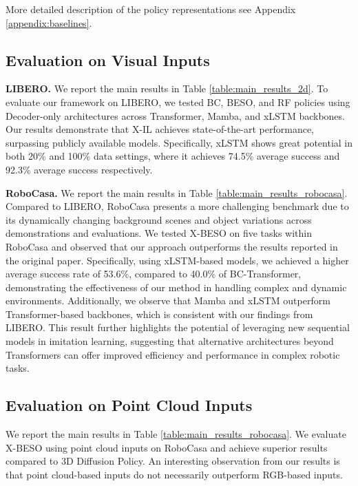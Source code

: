 
More detailed description of the policy representations see Appendix \ref{appendix:baselines}.



\subsection{Evaluation on Visual Inputs}
\textbf{LIBERO.} We report the main results in Table \ref{table:main_results_2d}. To evaluate our framework on LIBERO, we tested BC, BESO, and RF policies using Decoder-only architectures across Transformer, Mamba, and xLSTM backbones. Our results demonstrate that X-IL achieves state-of-the-art performance, surpassing publicly available models. Specifically, xLSTM shows great potential in both 20\% and 100\% data settings, where it achieves 74.5\% average success and 92.3\% average success respectively. 

\textbf{RoboCasa.} We report the main results in Table \ref{table:main_results_robocasa}. Compared to LIBERO, RoboCasa presents a more challenging benchmark due to its dynamically changing background scenes and object variations across demonstrations and evaluations. We tested X-BESO on five tasks within RoboCasa and observed that our approach outperforms the results reported in the original paper. Specifically, using xLSTM-based models, we achieved a higher average success rate of 53.6\%, compared to 40.0\% of BC-Transformer, demonstrating the effectiveness of our method in handling complex and dynamic environments. Additionally, we observe that Mamba and xLSTM outperform Transformer-based backbones, which is consistent with our findings from LIBERO. This result further highlights the potential of leveraging new sequential models in imitation learning, suggesting that alternative architectures beyond Transformers can offer improved efficiency and performance in complex robotic tasks.



\subsection{Evaluation on Point Cloud Inputs}
We report the main results in Table \ref{table:main_results_robocasa}.
We evaluate X-BESO using point cloud inputs on RoboCasa and achieve superior results compared to 3D Diffusion Policy. An interesting observation from our results is that point cloud-based inputs do not necessarily outperform RGB-based inputs.

